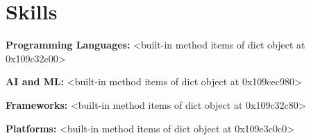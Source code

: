 \section{Skills}

    \begin{onecolentry}
        \textbf{Programming Languages:} <built-in method items of dict object at 0x109c32c00>
    \end{onecolentry}

    \vspace{0.05 cm}

    \begin{onecolentry}
        \textbf{AI and ML:} <built-in method items of dict object at 0x109cec980>
    \end{onecolentry}

    \vspace{0.05 cm}

    \begin{onecolentry}
        \textbf{Frameworks:} <built-in method items of dict object at 0x109c32c80>
    \end{onecolentry}

    \vspace{0.05 cm}

    \begin{onecolentry}
        \textbf{Platforms:} <built-in method items of dict object at 0x109e3c0c0>
    \end{onecolentry}

    \vspace{0.05 cm}

